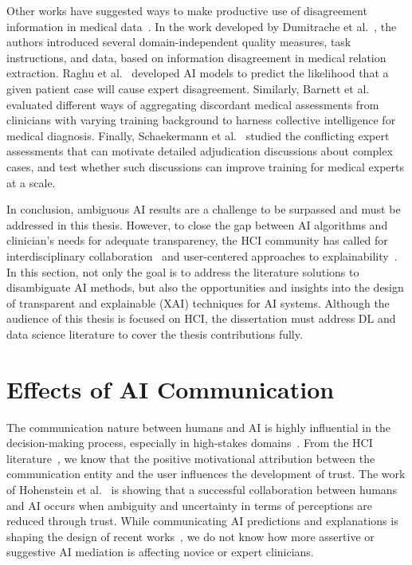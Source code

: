 Other works have suggested ways to make productive use of disagreement information in medical data~\cite{10.1001/jamanetworkopen.2019.0096, pmlr-v97-raghu19a, 10.1145/3313831.3376506}.
In the work developed by Dumitrache et al.~\cite{10.1145/3152889}, the authors introduced several domain-independent quality measures, task instructions, and data, based on information disagreement in medical relation extraction.
Raghu et al.~\cite{pmlr-v97-raghu19a} developed \ac{AI} models to predict the likelihood that a given patient case will cause expert disagreement.
Similarly, Barnett et al.~\cite{10.1001/jamanetworkopen.2019.0096} evaluated different ways of aggregating discordant medical assessments from clinicians with varying training background to harness collective intelligence for medical diagnosis.
Finally, Schaekermann et al.~\cite{10.1145/3313831.3376506, SchaekermannMike2020} studied the conflicting expert assessments that can motivate detailed adjudication discussions about complex cases, and test whether such discussions can improve training for medical experts at a scale.

In conclusion, ambiguous \ac{AI} results are a challenge to be surpassed and must be addressed in this thesis.
However, to close the gap between \ac{AI} algorithms and clinician's needs for adequate transparency, the \ac{HCI} community has called for interdisciplinary collaboration~\cite{10.1145/3173574.3174156, Tschandl2020} and user-centered approaches to explainability~\cite{10.1145/3290605.3300831, 10.1145/3313831.3376590}.
In this section, not only the goal is to address the literature solutions to disambiguate \ac{AI} methods, but also the opportunities and insights into the design of transparent and explainable (\ac{XAI}) techniques for \ac{AI} systems.
Although the audience of this thesis is focused on \ac{HCI}, the dissertation must address \ac{DL} and data science literature to cover the thesis contributions fully.

\section{Effects of AI Communication}
\label{sec:chap003008}

The communication nature between humans and \ac{AI} is highly influential in the decision-making process, especially in high-stakes domains~\cite{10.1145/3544548.3580682}.
From the \ac{HCI} literature~\cite{10.1145/3479587}, we know that the positive motivational attribution between the communication entity and the user influences the development of trust.
The work of Hohenstein et al.~\cite{HOHENSTEIN2020106190} is showing that a successful collaboration between humans and \ac{AI} occurs when ambiguity and uncertainty in terms of perceptions are reduced through trust.
While communicating \ac{AI} predictions and explanations is shaping the design of recent works~\cite{CALISTO2021102607}, we do not know how more assertive or suggestive \ac{AI} mediation is affecting novice or expert clinicians.

